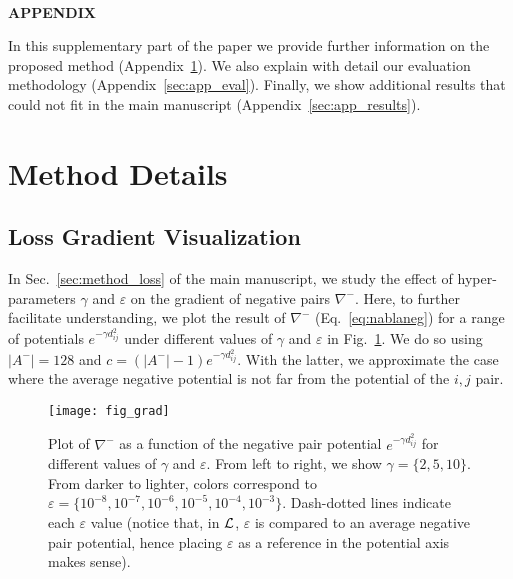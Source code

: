 
\begin{center}
~\\
{\large\textbf{APPENDIX}}
\end{center}

In this supplementary part of the paper we provide further information on the proposed method (Appendix~\ref{sec:app_method}). We also explain with detail our evaluation methodology (Appendix~\ref{sec:app_eval}). Finally, we show additional results that could not fit in the main manuscript (Appendix~\ref{sec:app_results}).


\section{Method Details}
\label{sec:app_method}

\subsection{Loss Gradient Visualization}

In Sec.~\ref{sec:method_loss} of the main manuscript, we study the effect of hyper-parameters $\gamma$ and $\varepsilon$ on the gradient of negative pairs $\nabla^-$. Here, to further facilitate understanding, we plot the result of $\nabla^-$ (Eq.~\ref{eq:nablaneg}) for a range of potentials $e^{-\gamma d^2_{ij}}$ under different values of $\gamma$ and $\varepsilon$ in Fig.~\ref{fig:grad}. We do so using $|A^-|=128$ and $c=(|A^-|-1) e^{-\gamma d^2_{ij}}$. With the latter, we approximate the case where the average negative potential is not far from the potential of the $i,j$ pair.

\begin{figure}[h]
\centerline{\texttt{[image: fig\_grad]}}
\vskip -0.2in
\caption{Plot of $\nabla^-$ as a function of the negative pair potential $e^{-\gamma d^2_{ij}}$ for different values of $\gamma$ and $\varepsilon$. From left to right, we show $\gamma=\{2,5,10\}$. From darker to lighter, colors correspond to $\varepsilon=\{10^{-8}, 10^{-7}, 10^{-6}, 10^{-5}, 10^{-4}, 10^{-3}\}$. Dash-dotted lines indicate each $\varepsilon$ value (notice that, in $\mathcal{L}$, $\varepsilon$ is compared to an average negative pair potential, hence placing $\varepsilon$ as a reference in the potential axis makes sense).}
\label{fig:grad}
\end{figure}

